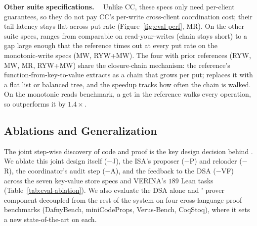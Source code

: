 \textbf{Other \sys{} suite specifications. \ }
%
Unlike CC, these specs only need per-client guarantees, so they do not pay CC's per-write cross-client coordination cost; their tail latency stays flat across put rate (Figure~\ref{fig:eval-perf}, MR). On the other \sys{} suite specs, \sys{} ranges from comparable on read-your-writes (chain stays short) to a gap large enough that the reference times out at every put rate on the monotonic-write specs (MW, RYW+MW). 
The four with prior references (RYW, MW, MR, RYW+MW) share the closure-chain mechanism: the reference's function-from-key-to-value extracts as a chain that grows per put; \sys{} replaces it with a flat list or balanced tree, and the speedup tracks how often the chain is walked. 
% 
On the monotonic reads benchmark, a get in the reference walks every operation, so \sys{} outperforms it by $1.4\times$.



\subsection{Ablations and Generalization}
\label{sec:eval-ablations}

The joint step-wise discovery of code and proof is the key design decision behind \sys{}.
We ablate this joint design itself ($-$J), the ISA's proposer ($-$P) and reloader ($-$R), the coordinator's audit step ($-$A), and the \coq{} feedback to the DSA ($-$VF) across the seven key-value store specs and VERINA's $189$ Lean tasks (Table~\ref{tab:eval-ablation}). We also evaluate the DSA alone and \sys{}' prover component decoupled from the rest of the system on four cross-language proof benchmarks (DafnyBench, miniCodeProps, Verus-Bench, CoqStoq), where it sets a new state-of-the-art on each.


